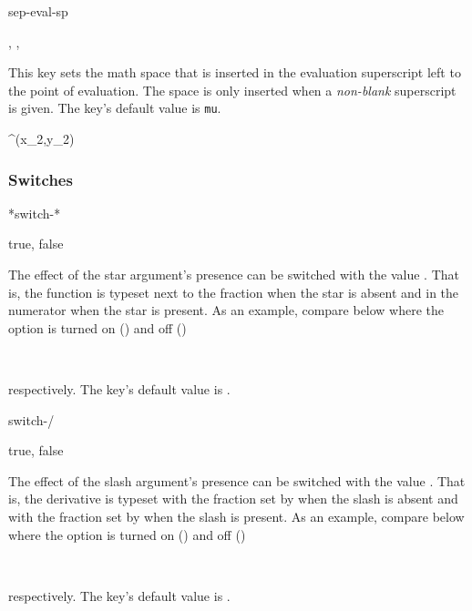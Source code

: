 \begin{option}{sep-eval-sp}
	\begin{values}[default = 0]
		, , 
	\end{values}
	This key sets the math space that is inserted in the evaluation superscript left to the point of evaluation. The space is only inserted when a \emph{non-blank} superscript is given. The key's default value is  \texttt{mu}.
	\begin{example}
		^{(x_2,y_2)}
	\end{example}
\end{option}

\subsubsection*{Switches}

\begin{option}*{switch-*}
	\begin{values}[default = false]
		true, false
	\end{values}
	The effect of the star argument's presence can be switched with the value . That is, the function is typeset next to the fraction when the star is absent and in the numerator when the star is present. As an example, compare below where the option is turned on () and off (\val{false})
	\begin{example}
		\pdv[switch-*=false]{y}{x} \\
		\pdv[switch-*=true]{y}{x}
	\end{example}
	respectively. The key's default value is \default.
\end{option}

\begin{option}{switch-/}
	\begin{values}[default = false]
		true, false
	\end{values}
	The effect of the slash argument's presence can be switched with the value . That is, the derivative is typeset with the fraction set by  when the slash is absent and with the fraction set by  when the slash is present. As an example, compare below where the option is turned on () and off ()
	\begin{example}
		\pdv[switch-/=false]{y}{x} \\
		\pdv[switch-/=true]{y}{x}
	\end{example}
	respectively. The key's default value is .
\end{option}

